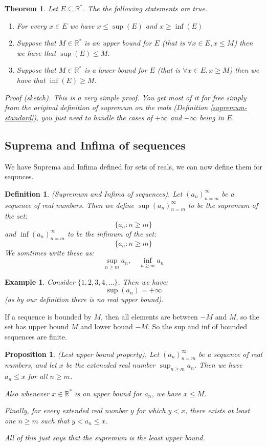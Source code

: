 \documentclass{article}
\newtheorem{example}{Example}[subsection]
\newtheorem{definition}{Definition}[subsection]
\newtheorem{proposition}{Proposition}[subsection]
\newtheorem{theorem}{Theorem}[subsection]
\newcommand{\R}{\mathbb{R}}
\let\it\textit
\begin{document}
\begin{theorem}
	Let $E \subseteq \R^*$. The the following 
	statements are true.
	\begin{enumerate}[label=(\alph*)]
		\item For every $x \in E$ 
			we have $x \leq \sup(E)$ 
			and $x \geq \inf(E)$
		\item Suppose that $M \in \R^*$ is 
			an upper bound for $E$ 
			(that is $\forall x \in E, x \leq M$) 
			then we have that $\sup(E) \leq M$. 
		\item Suppose that $M \in \R^*$ is a lower 
			bound for $E$ 
			(that is $\forall x \in E, x \geq M$) 
			then we have that $\inf(E) \geq M$.
	\end{enumerate}

	\it{Proof} (sketch). This is a very simple proof. 
	You get most of it for free simply from 
	the original definition of supremum 
	on the reals (Definition \ref{supremum-standard}),
	you just need to handle the cases of 
	$+ \infty$ and $- \infty$ being in $E$.
\end{theorem}


\subsection{Suprema and Infima of sequences} 

We have Suprema and Infima defined for sets of reals, 
we can now define them for sequnces. 

\begin{definition}
	(Supremum and Infima of sequences). Let 
	$(a_n)_{n=m}^\infty$ be a sequence of real numbers. 
	Then we define $\sup (a_n)_{n=m}^\infty$ to be 
	the supremum of the set: 
	$$
	\{a_n : n \geq m\}
	$$
	and $\inf (a_n)_{n=m}^\infty$ to be
	the infimum of the set:
	$$
	\{a_n : n \geq m\} 
	$$
	We somtimes write these as:
	$$
	\sup_{n \geq m} a_n, \quad \inf_{n \geq m} a_n
	$$
\end{definition}

\begin{example}
	Consider $\{1,2,3,4,\dots\}$. Then we have: 
	$$
	\sup (a_n) = + \infty
	$$
	(as by our definition there is no real upper bound).
\end{example}

If a sequence is bounded by $M$, then all elements 
are between $-M$ and $M$, so the set has 
upper bound $M$ and lower bound $-M$. 
So the sup and inf of bounded sequences 
are finite.

\begin{proposition}
	(Lest upper bound property), Let $(a_n)_{n=m}^\infty$	be
	a sequence of real numbers, and let $x$ be the exteneded 
	real number $\sup_{n \geq m} a_n$. Then we have 
	$a_n \leq x$ for all $n \geq m$. 

	Also 
	whenever $x \in \R^*$ is an upper bound 
	for $a_n$, we have $x \leq M$. 

	Finally, for every extended real number $y$ for 
	which $y < x$, there exists at least one 
	$n \geq m$ such that $y < a_n \leq x$.

	All of this just says that the supremum is 
	the least upper bound.
\end{proposition}
\end{document}

